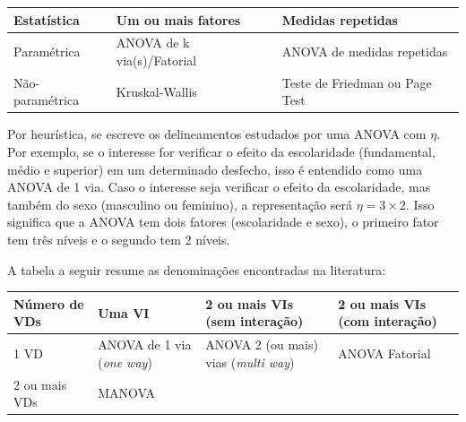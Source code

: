 \documentclass[
]{book}
\begin{document}
\begin{longtable}[]{@{}lll@{}}
\toprule
Estatística & Um ou mais fatores & Medidas repetidas\tabularnewline
\midrule
\endhead
Paramétrica & ANOVA de k via(s)/Fatorial & ANOVA de medidas
repetidas\tabularnewline
Não-paramétrica & Kruskal-Wallis & Teste de Friedman ou Page
Test\tabularnewline
\bottomrule
\end{longtable}

Por heurística, se escreve os delineamentos estudados por uma ANOVA com
\(\eta\). Por exemplo, se o interesse for verificar o efeito da
escolaridade (fundamental, médio e superior) em um determinado desfecho,
isso é entendido como uma ANOVA de 1 via. Caso o interesse seja
verificar o efeito da escolaridade, mas também do sexo (masculino ou
feminino), a representação será \(\eta = 3 \times 2\). Isso significa
que a ANOVA tem dois fatores (escolaridade e sexo), o primeiro fator tem
três níveis e o segundo tem 2 níveis.

A tabela a seguir resume as denominações encontradas na literatura:

\begin{longtable}[]{@{}llll@{}}
\toprule
\begin{minipage}[b]{0.22\columnwidth}\raggedright
Número de VDs\strut
\end{minipage} & \begin{minipage}[b]{0.22\columnwidth}\raggedright
Uma VI\strut
\end{minipage} & \begin{minipage}[b]{0.22\columnwidth}\raggedright
2 ou mais VIs (sem interação)\strut
\end{minipage} & \begin{minipage}[b]{0.22\columnwidth}\raggedright
2 ou mais VIs (com interação)\strut
\end{minipage}\tabularnewline
\midrule
\endhead
\begin{minipage}[t]{0.22\columnwidth}\raggedright
1 VD\strut
\end{minipage} & \begin{minipage}[t]{0.22\columnwidth}\raggedright
ANOVA de 1 via (\emph{one way})\strut
\end{minipage} & \begin{minipage}[t]{0.22\columnwidth}\raggedright
ANOVA 2 (ou mais) vias (\emph{multi way})\strut
\end{minipage} & \begin{minipage}[t]{0.22\columnwidth}\raggedright
ANOVA Fatorial\strut
\end{minipage}\tabularnewline
\begin{minipage}[t]{0.22\columnwidth}\raggedright
2 ou mais VDs\strut
\end{minipage} & \begin{minipage}[t]{0.22\columnwidth}\raggedright
MANOVA\strut
\end{minipage} & \begin{minipage}[t]{0.22\columnwidth}\raggedright
\strut
\end{minipage} & \begin{minipage}[t]{0.22\columnwidth}\raggedright
\strut
\end{minipage}\tabularnewline
\bottomrule
\end{longtable}
\end{document}
